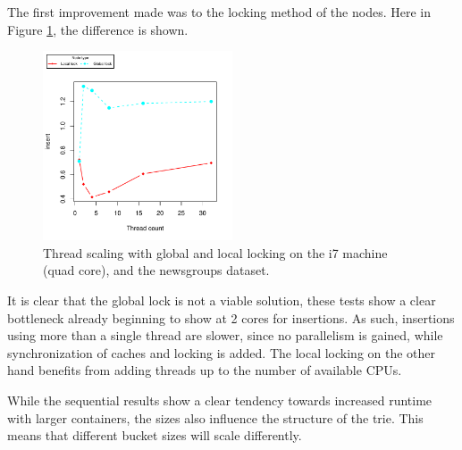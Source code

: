 The first improvement made was to the locking method of the nodes. Here in
Figure \ref{fig:globallock}, the difference is shown.
\begin{figure}[h!]
    \centering
    \includegraphics[width=0.5\textwidth]{plots/ts_locking}
    \caption{Thread scaling with global and local locking on the i7 machine (quad core),
    and the newsgroups dataset.}
    \label{fig:globallock}
\end{figure}
It is clear that the global lock is not a viable solution, these tests
show a clear bottleneck already beginning to show at 2 cores for insertions.
As such, insertions using more than a single thread are slower, since no
parallelism is gained, while synchronization of caches and locking is added.
The local locking on the other hand benefits from adding threads up to the
number of available CPUs.



While the sequential results show a clear tendency towards increased runtime
with larger containers, the sizes also influence the structure of the trie.
This means that different bucket sizes will scale differently.

